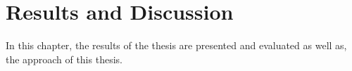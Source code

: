 \chapter{Results and Discussion}
\label{Chapter::Results and Discussion}

In this chapter, the results of the thesis are presented and evaluated as well as, the approach of this thesis.

